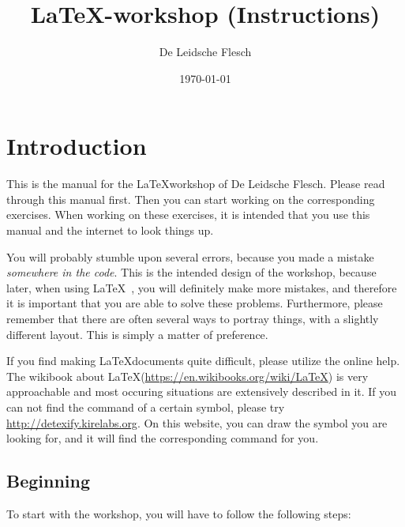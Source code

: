 \documentclass{article}
\title{\LaTeX-workshop (Instructions)}
\author{De Leidsche Flesch}
\date{\today}
\begin{document}
\maketitle
\tableofcontents
\newpage

\section{Introduction}

This is the manual for the \LaTeX workshop of De Leidsche Flesch.
Please read through this manual first. Then you can start working on the corresponding exercises. When working on these exercises, 
it is intended that you use this manual and the internet to look things up.

You will probably stumble upon several errors, because you made a mistake \emph{somewhere in the code}.
This is the intended design of the workshop, because later, when using \LaTeX\ , you will definitely make more mistakes,
and therefore it is important that you are able to solve these problems. Furthermore, please remember that there are 
often several ways to portray things, with a slightly different layout. This is simply a matter of preference.

If you find making \LaTeX documents quite difficult, please utilize the online help. The wikibook about \LaTeX (\url{https://en.wikibooks.org/wiki/LaTeX}) 
is very approachable and most occuring situations are extensively described in it. If you can not find the command of a certain symbol,
please try \url{http://detexify.kirelabs.org}. On this website, you can draw the symbol you are looking for, and it will find the corresponding command for you. 

\subsection{Beginning}

To start with the workshop, you will have to follow the following steps:
\end{document}
